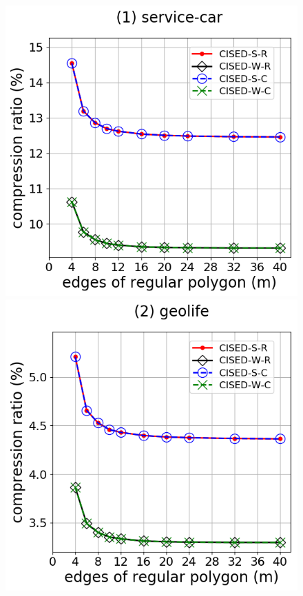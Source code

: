 {%


\begin{figure}[tb!]
\centering
\includegraphics[scale = 0.275]{Figures/Exp-M-e-60-CR-service.png}\hspace{3ex}
\includegraphics[scale = 0.275]{Figures/Exp-M-e-60-CR-geolife.png}\hspace{3ex}

\end{figure}}
